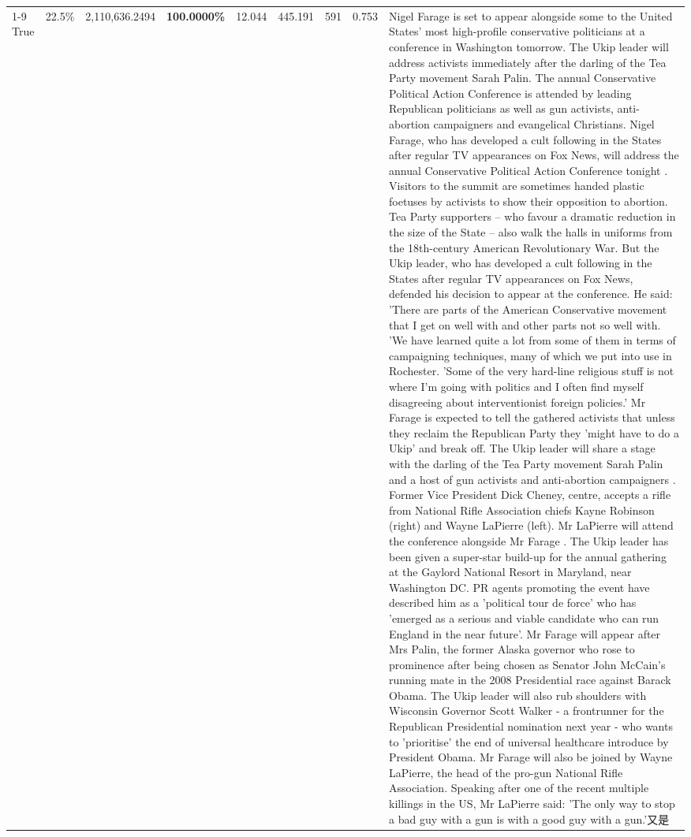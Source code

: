 \begin{table}[H]
\begin{tabular}{lllrlllll}
\cline{1-9}
True & 22.5\% & 2,110,636.2494 & \bfseries \color{red} 100.0000\% & 12.044 & 445.191 & 591 & 0.753 & Nigel Farage is set to appear alongside some to the United States' most high-profile conservative politicians at a conference in Washington tomorrow. The Ukip leader will address activists immediately after the darling of the Tea Party movement Sarah Palin. The annual Conservative Political Action Conference is attended by leading Republican politicians as well as gun activists, anti-abortion campaigners and evangelical Christians. Nigel Farage, who has developed a cult following in the States after regular TV appearances on Fox News, will address the annual Conservative Political Action Conference tonight . Visitors to the summit are sometimes handed plastic foetuses by activists to show their opposition to abortion. Tea Party supporters – who favour a dramatic reduction in the size of the State – also walk the halls in uniforms from the 18th-century American Revolutionary War. But the Ukip leader, who has developed a cult following in the States after regular TV appearances on Fox News, defended his decision to appear at the conference. He said: 'There are parts of the American Conservative movement that I get on well with and other parts not so well with. 'We have learned quite a lot from some of them in terms of campaigning techniques, many of which we put into use in Rochester. 'Some of the very hard-line religious stuff is not where I'm going with politics and I often find myself disagreeing about interventionist foreign policies.' Mr Farage is expected to tell the gathered activists that unless they reclaim the Republican Party they 'might have to do a Ukip' and break off. The Ukip leader will share a stage with the darling of the Tea Party movement Sarah Palin and a host of gun activists and anti-abortion campaigners . Former Vice President Dick Cheney, centre, accepts a rifle from National Rifle Association chiefs Kayne Robinson (right) and Wayne LaPierre (left). Mr LaPierre will attend the conference alongside Mr Farage . The Ukip leader has been given a super-star build-up for the annual gathering at the Gaylord National Resort in Maryland, near Washington DC. PR agents promoting the event have described him as a 'political tour de force' who has 'emerged as a serious and viable candidate who can run England in the near future'. Mr Farage will appear after Mrs Palin, the former Alaska governor who rose to prominence after being chosen as Senator John McCain's running mate in the 2008 Presidential race against Barack Obama. The Ukip leader will also rub shoulders with Wisconsin Governor Scott Walker - a frontrunner for the Republican Presidential nomination next year - who wants to 'prioritise' the end of universal healthcare introduce by President Obama. Mr Farage will also be joined by Wayne LaPierre, the head of the pro-gun National Rifle Association. Speaking after one of the recent multiple killings in the US, Mr LaPierre said: 'The only way to stop a bad guy with a gun is with a good guy with a gun.'又是 \\

\end{tabular}
\end{table}
